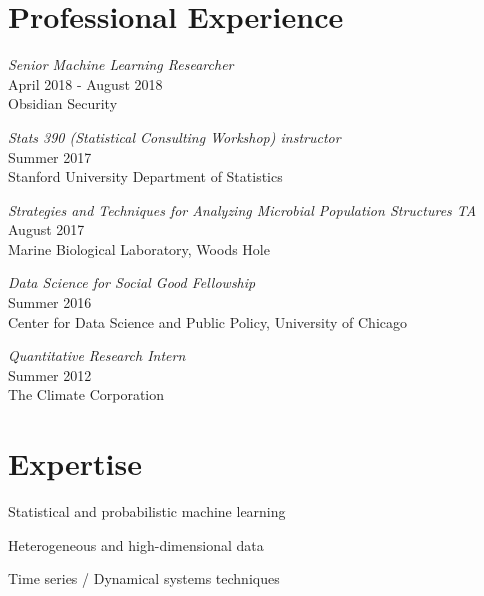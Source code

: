 \documentclass[letterpaper]{article}
\renewenvironment{itemize}{
  \begin{list}{}{
    \setlength{\leftmargin}{1.5em}
  }
}{
  \end{list}
}
\begin{document}
\section*{Professional Experience}
\begin{itemize}
\item \textit{Senior Machine Learning Researcher} \\
  April 2018 - August 2018 \\
  Obsidian Security
\item \textit{Stats 390 (Statistical Consulting Workshop) instructor} \\
  Summer 2017 \\
  Stanford University Department of Statistics
\item \textit{Strategies and Techniques for Analyzing Microbial Population Structures TA} \\
  August 2017 \\
  Marine Biological Laboratory, Woods Hole
\item \textit{Data Science for Social Good Fellowship} \\
  Summer 2016 \\
  Center for Data Science and Public Policy, University of Chicago
\item \textit{Quantitative Research Intern} \\
  Summer 2012 \\
  The Climate Corporation
\end{itemize}

\section*{Expertise}
\begin{itemize}
  \item Statistical and probabilistic machine learning
  \item Heterogeneous and high-dimensional data
  \item Time series / Dynamical systems techniques
\end{itemize}
\end{document}
